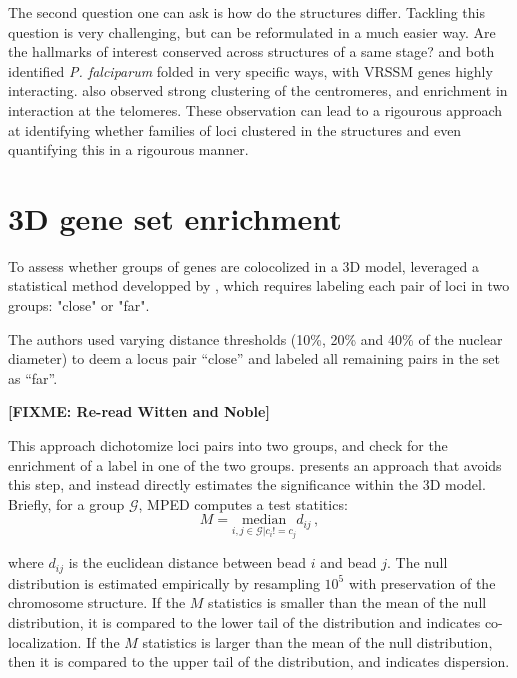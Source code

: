 \documentclass[letterpaper,12pt]{article}
\newcommand{\fixme}[1]{\textbf{[FIXME: #1]}}
\begin{document}
The second question one can ask is how do the structures differ. Tackling this
question is very challenging, but can be reformulated in a much easier way.
Are the hallmarks of interest conserved across structures of a same stage?
\citet{ay:three-dimensional} and \citet{lemieux:genome-wide} both identified
{\em P. falciparum} folded in very specific ways, with VRSSM genes highly
interacting. \citet{ay:three-dimensional} also observed strong clustering of
the centromeres, and enrichment in interaction at the telomeres. These
observation can lead to a rigourous approach at identifying whether families
of loci clustered in the structures and even quantifying this in a rigourous
manner.

\section{3D gene set enrichment}

To assess whether groups of genes are colocolized in a 3D model,
\citet{ay:three-dimensional} leveraged a statistical method developped by
\citet{witten:assessment}, which requires labeling each pair of loci in two groups:
"close" or "far". 

The authors used varying distance
thresholds (10\%, 20\% and 40\% of the nuclear diameter) to deem a locus pair
“close” and labeled all remaining
pairs in the set as “far”. 

\fixme{Re-read Witten and Noble}

This approach dichotomize loci pairs into two groups, and check for the
enrichment of a label in one of the two groups. \citep{capurso:distance-based}
presents an approach that avoids this step, and instead directly estimates the
significance within the 3D model. Briefly, for a group $\mathcal{G}$, MPED
computes a test statitics:
\begin{equation*}
M = \underset{i,j \in \mathcal{G}| c_i != c_j}{\text{median}} d_{ij}\,,
\end{equation*}

where $d_{ij}$ is the euclidean distance between bead $i$ and bead $j$. The
null distribution is estimated empirically by resampling $10^5$ with
preservation of the chromosome structure. If the $M$ statistics is smaller
than the mean of the null distribution, it is compared to the lower tail of
the distribution and indicates co-localization. If the $M$ statistics is
larger than the mean of the null distribution, then it is compared to the
upper tail of the distribution, and indicates dispersion.
\end{document}
